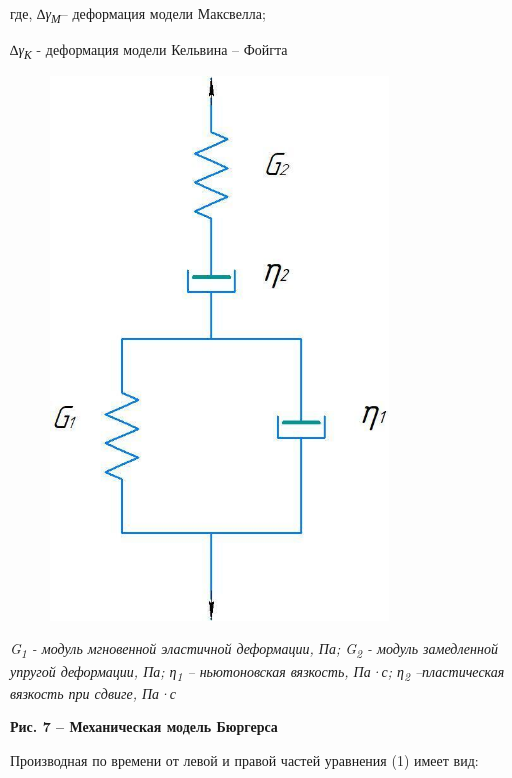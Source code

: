 где, \emph{∆γ\textsubscript{М}}-- деформация модели Максвелла;

\emph{∆γ\textsubscript{К}} - деформация модели Кельвина -- Фойгта

\begin{figure}[H]
	\centering
	\includegraphics[width=0.8\textwidth]{assets/317}
	\caption*{}
\end{figure}

\emph{G\textsubscript{1} - модуль мгновенной эластичной деформации, Па;
G\textsubscript{2} - модуль замедленной упругой деформации, Па;
η\textsubscript{1} -- ньютоновская вязкость, Па·с; η\textsubscript{2}
--пластическая вязкость при сдвиге, Па·с}

{\bfseries Рис. 7 -- Механическая модель Бюргерса}

Производная по времени от левой и правой частей уравнения (1) имеет вид:

